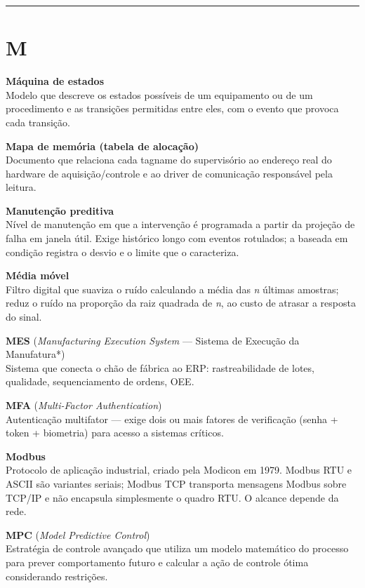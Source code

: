 \begin{center}\rule{0.5\linewidth}{0.5pt}\end{center}

\section{M}\label{m}

\textbf{Máquina de estados}\\
Modelo que descreve os estados possíveis de um equipamento ou de um procedimento e as transições permitidas entre eles, com o evento que provoca cada transição.

\textbf{Mapa de memória (tabela de alocação)}\\
Documento que relaciona cada tagname do supervisório ao endereço real do hardware de aquisição/controle e ao driver de comunicação responsável pela leitura.

\textbf{Manutenção preditiva}\\
Nível de manutenção em que a intervenção é programada a partir da projeção de falha em janela útil. Exige histórico longo com eventos rotulados; a baseada em condição registra o desvio e o limite que o caracteriza.

\textbf{Média móvel}\\
Filtro digital que suaviza o ruído calculando a média das \emph{n} últimas amostras; reduz o ruído na proporção da raiz quadrada de \emph{n}, ao custo de atrasar a resposta do sinal.

\textbf{MES} (\emph{Manufacturing Execution System} --- Sistema de Execução da Manufatura*)\\
Sistema que conecta o chão de fábrica ao ERP: rastreabilidade de lotes, qualidade, sequenciamento de ordens, OEE.

\textbf{MFA} (\emph{Multi-Factor Authentication})\\
Autenticação multifator --- exige dois ou mais fatores de verificação (senha + token + biometria) para acesso a sistemas críticos.

\textbf{Modbus}\\
Protocolo de aplicação industrial, criado pela Modicon em 1979. Modbus RTU e ASCII são variantes seriais; Modbus TCP transporta mensagens Modbus sobre TCP/IP e não encapsula simplesmente o quadro RTU. O alcance depende da rede.

\textbf{MPC} (\emph{Model Predictive Control})\\
Estratégia de controle avançado que utiliza um modelo matemático do processo para prever comportamento futuro e calcular a ação de controle ótima considerando restrições.

